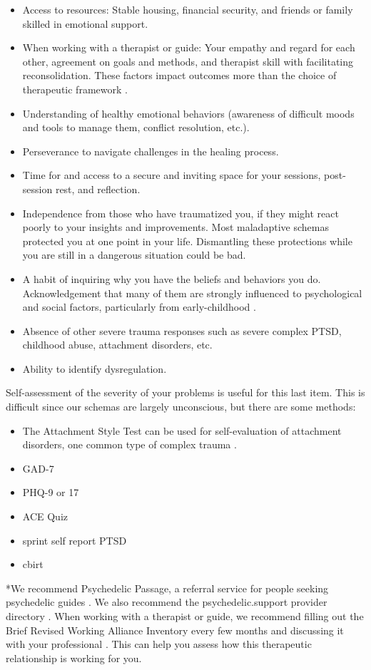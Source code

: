 \documentclass[12pt,letterpaper]{article}
\begin{document}
\begin{itemize}
    \item Access to resources: Stable housing, financial security, and friends or family skilled in emotional support.
    \item When working with a therapist or guide: Your empathy and regard for each other, agreement on goals and methods, and therapist skill with facilitating reconsolidation. These factors impact outcomes more than the choice of therapeutic framework \cite{wampoldCommonFactors}.
    \item Understanding of healthy emotional behaviors (awareness of difficult moods and tools to manage them, conflict resolution, etc.). 
    \item Perseverance to navigate challenges in the healing process.
    \item Time for and access to a secure and inviting space for your sessions, post-session rest, and reflection.
    \item Independence from those who have traumatized you, if they might react poorly to your insights and improvements. Most maladaptive schemas protected you at one point in your life. Dismantling these protections while you are still in a dangerous situation could be bad.
    \item A habit of inquiring why you have the beliefs and behaviors you do. Acknowledgement that many of them are strongly influenced to psychological and social factors, particularly from early-childhood \cite{brownAttachmentDisturbances}. 
    \item Absence of other severe trauma responses such as severe complex PTSD, childhood abuse, attachment disorders, etc.
    \item Ability to identify dysregulation.
\end{itemize}
Self-assessment of the severity of your problems is useful for this last item. This is difficult since our schemas are largely unconscious, but there are some methods:
\begin{itemize}
    \item The Attachment Style Test can be used for self-evaluation of attachment disorders, one common type of complex trauma \cite{attachmentProject}.
    \item GAD-7
    \item PHQ-9 or 17
    \item ACE Quiz
    \item sprint self report PTSD
    \item cbirt
\end{itemize}
*We recommend Psychedelic Passage, a referral service for people seeking psychedelic guides \cite{psychedelicPassage}. We also recommend the psychedelic.support provider directory \cite{psychedelicSupportList}. When working with a therapist or guide, we recommend filling out the Brief Revised Working Alliance Inventory every few months and discussing it with your professional \cite{BRWAIdownload,mallinckrodtBRWAI}. This can help you assess how this therapeutic relationship is working for you.
\end{document}
